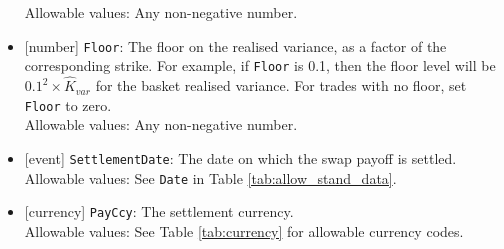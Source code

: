 \begin{itemize}
  Allowable values: Any non-negative number.
  \item{}[number] \lstinline!Floor!: The floor on the realised variance, as a factor of the corresponding strike. For example,
  if \lstinline!Floor! is 0.1, then the floor level will be $0.1^2 \times \hat{K}_{var}$ for the basket realised variance.
  For trades with no floor, set \lstinline!Floor! to zero. \\
  Allowable values: Any non-negative number.
  \item{}[event] \lstinline!SettlementDate!: The date on which the swap payoff is settled. \\
  Allowable values: See \lstinline!Date! in Table \ref{tab:allow_stand_data}.
  \item{}[currency] \lstinline!PayCcy!: The settlement currency. \\
  Allowable values: See Table \ref{tab:currency} for allowable currency codes.
\end{itemize}
